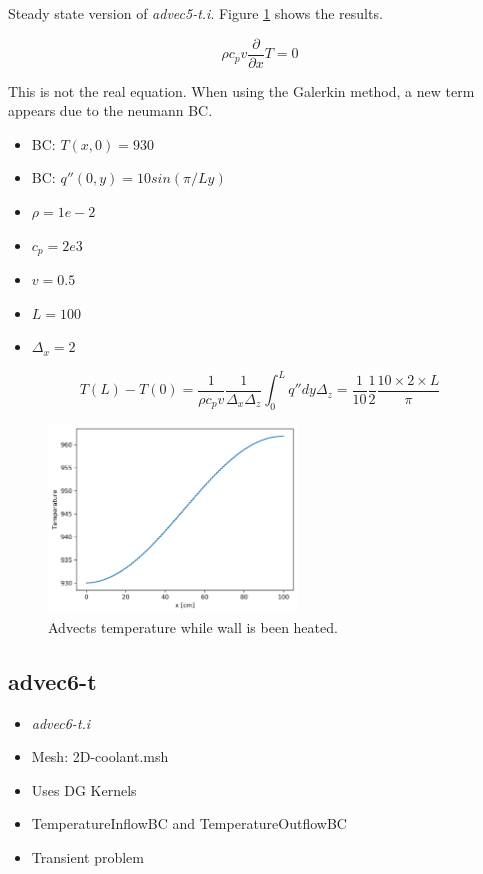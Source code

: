 \documentclass[11pt,letterpaper]{article}
\begin{document}
    Steady state version of \textit{advec5-t.i}.
    Figure \ref{fig:advec5-ss} shows the results.

	\begin{equation}
    \rho c_p v \frac{\partial}{\partial x} T = 0
	\end{equation}

	This is not the real equation. When using the Galerkin method, a new term appears due to the neumann BC.

	\begin{itemize}
		\item BC: $T(x, 0) = 930$
		\item BC: $q''(0, y) = 10 sin (\pi/L y)$
		\item $\rho = 1e-2$
		\item $c_p = 2e3$
		\item $v = 0.5$
		\item $L = 100$
		\item $\Delta_x = 2$
	\end{itemize}

	\begin{equation}
	T(L) - T(0) = \frac{1}{\rho c_p v}\frac{1}{\Delta_x \Delta_z}\int^L_0 q'' dy \Delta_z= \frac{1}{10} \frac{1}{2} \frac{10 \times 2 \times L}{\pi}
	\end{equation}

	\begin{figure}[htbp!]
		\centering
		\includegraphics[height=5cm]{advec5-ss}
		\caption{Advects temperature while wall is been heated.}
		\label{fig:advec5-ss}
	\end{figure}

	\subsection{advec6-t}

	\begin{itemize}
		\item \textit{advec6-t.i}
		\item Mesh: 2D-coolant.msh
		\item Uses DG Kernels
		\item TemperatureInflowBC and TemperatureOutflowBC
		\item Transient problem
	\end{itemize}
\end{document}
